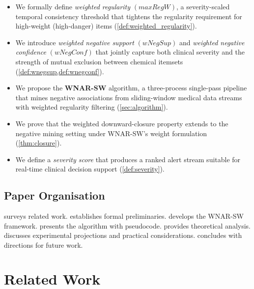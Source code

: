 \documentclass[10pt,twocolumn]{article}
\theoremstyle{plain}
\theoremstyle{definition}
\theoremstyle{remark}
\newcommand{\wNegSup}{\mathit{wNegSup}}
\newcommand{\wNegConf}{\mathit{wNegConf}}
\newcommand{\maxRegW}{\mathit{maxRegW}}
\begin{document}
\begin{itemize}[leftmargin=*]
  \item We formally define \emph{weighted regularity}
        $(\maxRegW)$, a severity-scaled temporal consistency threshold
        that tightens the regularity requirement for high-weight
        (high-danger) items (\cref{def:weighted_regularity}).

  \item We introduce \emph{weighted negative support}
        $(\wNegSup)$ and \emph{weighted negative confidence}
        $(\wNegConf)$ that jointly capture both clinical severity and
        the strength of mutual exclusion between chemical itemsets
        (\cref{def:wnegsup,def:wnegconf}).

  \item We propose the \textbf{WNAR-SW} algorithm, a three-process
        single-pass pipeline that mines negative associations from
        sliding-window medical data streams with weighted regularity
        filtering (\cref{sec:algorithm}).

  \item We prove that the weighted downward-closure property extends
        to the negative mining setting under WNAR-SW's weight
        formulation (\cref{thm:closure}).

  \item We define a \emph{severity score} that produces a ranked
        alert stream suitable for real-time clinical decision support
        (\cref{def:severity}).
\end{itemize}

\subsection{Paper Organisation}
\label{subsec:organisation}

 surveys related work.
 establishes formal preliminaries.
 develops the WNAR-SW framework.
 presents the algorithm with pseudocode.
 provides theoretical analysis.
 discusses experimental projections and
practical considerations.
 concludes with directions for future work.

\section{Related Work}
\label{sec:related}
\end{document}
